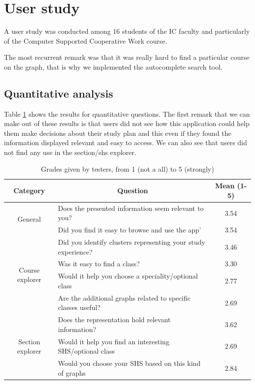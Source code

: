 \section{User study}
A user study was conducted among 16 students of the IC faculty and particularly of the Computer Supported Cooperative Work course.  

The most recurrent remark was that it was really hard to find a particular course on the graph, that is why we implemented the autocomplete search tool.

\subsection{Quantitative analysis}
Table \ref{tab:userstudy} shows the results for quantitative questions. The first remark that we can make out of these results is that users did not see how this application could help them make decisions about their study plan and this even if they found the information displayed relevant and easy to access. We can also see that users did not find any use in the section/shs explorer. 
\begin{table}[H]
\center
\begin{tabular}{|c|l|c|}
\hline 
Category & \multicolumn{1}{|c|}{Question} & Mean (1-5)\\
\hline
\multirow{2}{*}{General} 
	& Does the presented information seem relevant to you? & 3.54 \\
	& Did you find it easy to browse and use the app' & 3.54 \\
\hline
\multirow{4}{*}{Course explorer}
	& Did you identify clusters representing your study experience? & 3.46 \\
	& Was it easy to find a class? & 3.30 \\
	& Would it help you choose a speciality/optional class & 2.77 \\
	& Are the additional graphs related to specific classes useful? & 2.69\\
\hline
\multirow{3}{*}{Section explorer}
	& Does the representation hold relevant information? & 3.62 \\
	& Would it help you find an interesting SHS/optional class & 2.69 \\
	& Would you choose your SHS based on this kind of graphs& 2.84 \\
\hline
\end{tabular}
\label{tab:userstudy}
\caption{Grades given by testers, from 1 (not a all) to 5 (strongly)}
\end{table}

